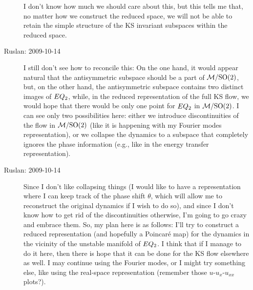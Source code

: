 \begin{description}
I don't know how much we should care about this, but this
tells me that, no matter how we construct the reduced space,
we will not be able to retain the simple structure of the KS
invariant subspaces within the reduced space.

\item[Ruslan: 2009-10-14]

I still don't see how to reconcile this: On the one hand, it
would appear natural that the antisymmetric subspace should
be a part of ${\cal M}/\textrm{SO}(2)$, but, on the other hand, the
antisymmetric subspace contains two distinct images of
$EQ_{2}$, while, in the reduced representation of the full
KS flow, we would hope that there would be only one point for
$EQ_{2}$ in ${\cal M}/\textrm{SO}(2)$.  I can see only two possibilities
here: either we introduce discontinuities of the flow in
${\cal M}/\textrm{SO}(2)$ (like it is happening with my Fourier modes
representation), or we collapse the dynamics to a subspace
that completely ignores the phase information (e.g., like in
the energy transfer representation).


\item[Ruslan: 2009-10-14]
Since I don't like collapsing things (I would like to have a
representation where I can keep track of the phase shift
$\theta$, which will allow me to reconstruct the original
dynamics if I wish to do so), and since I don't know how to
get rid of the discontinuities otherwise, I'm going to go
crazy and embrace them.  So, my plan here is as follows:
I'll try to construct a reduced representation (and hopefully
a Poincar\'e map) for the dynamics in the vicinity of the
unstable manifold of $EQ_{2}$. I think that if I manage to
do it here, then there is hope that it can be done for the KS
flow elsewhere as well.  I may continue using the Fourier
modes, or I might try something else, like using the
real-space representation (remember those $u$-$u_x$-$u_{xx}$
plots?).




\end{description}
